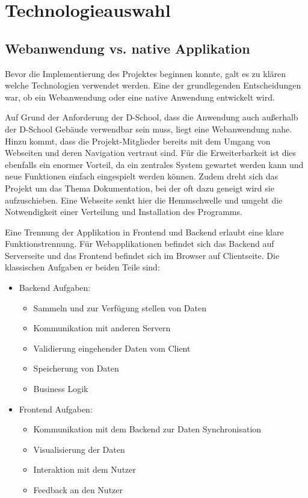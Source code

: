 \section{Technologieauswahl}
\subsection{Webanwendung vs. native Applikation}
Bevor die Implementierung des Projektes beginnen konnte, galt es zu klären welche Technologien verwendet werden. Eine der grundlegenden Entscheidungen war, ob ein Webanwendung oder eine native Anwendung entwickelt wird. 

Auf Grund der Anforderung der D-School, dass die Anwendung auch außerhalb der D-School Gebäude verwendbar sein muss, liegt eine Webanwendung nahe. Hinzu kommt, dass die Projekt-Mitglieder bereits mit dem Umgang von Webseiten und deren Navigation vertraut sind. Für die Erweiterbarkeit ist dies ebenfalls ein enormer Vorteil, da ein zentrales System gewartet werden kann und neue Funktionen einfach eingespielt werden können. Zudem dreht sich das Projekt um das Thema Dokumentation, bei der oft dazu geneigt wird sie aufzuschieben. Eine Webseite senkt hier die Hemmschwelle und umgeht die Notwendigkeit einer Verteilung und Installation des Programms.

Eine Trennung der Applikation in Frontend und Backend erlaubt eine klare Funktionstrennung. Für Webapplikationen befindet sich das Backend auf Serverseite und das Frontend befindet sich im Browser auf Clientseite. Die klassischen Aufgaben er beiden Teile sind:

\begin{itemize}
  \item Backend Aufgaben:
  \begin{itemize}
    \item Sammeln und zur Verfügung stellen von Daten
    \item Kommunikation mit anderen Servern
    \item Validierung eingehender Daten vom Client
    \item Speicherung von Daten
    \item Business Logik
  \end{itemize}

\item Frontend Aufgaben:
  \begin{itemize}
    \item Kommunikation mit dem Backend zur Daten Synchronisation 
\item Visualisierung der Daten
    \item Interaktion mit dem Nutzer
    \item Feedback an den Nutzer
  \end{itemize}
\end{itemize}

